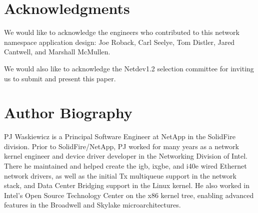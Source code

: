 \documentclass[letterpaper]{article}
\begin{document}
\section{Acknowledgments}
We would like to acknowledge the engineers who contributed to this network namespace application design: Joe Roback, Carl Seelye, Tom Distler, Jared Cantwell, and Marshall McMullen.

We would also like to acknowledge the Netdev1.2 selection committee for inviting us to submit and present this paper.




\section{Author Biography}
PJ Waskiewicz is a Principal Software Engineer at NetApp in the SolidFire division. Prior to SolidFire/NetApp, PJ worked for many years as a network kernel engineer and device driver developer in the Networking Division of Intel. There he maintained and helped create the igb, ixgbe, and i40e wired Ethernet network drivers, as well as the initial Tx multiqueue support in the network stack, and Data Center Bridging support in the Linux kernel. He also worked in Intel's Open Source Technology Center on the x86 kernel tree, enabling advanced features in the Broadwell and Skylake microarchitectures.
\end{document}
